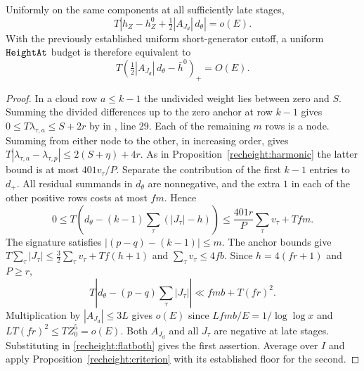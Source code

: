 \begin{corollary}\label{recheight:period-degree}
Uniformly on the same components at all sufficiently late stages,
\[
    T\left|h_Z-h_Z^0+\tfrac12|A_{J_d}|\,d_\theta\right|=o(E).
\]
With the previously established uniform short-generator cutoff, a
uniform \(\texttt{HeightAt}\) budget is therefore equivalent to
\[
       T\left(\tfrac12|A_{J_d}|\,d_\theta-\bar h^0\right)_+=O(E).
\]
\end{corollary}
\begin{proof}
In a cloud row \(a\le k-1\) the undivided weight lies between
zero and \(S\). Summing the divided differences up to the zero
anchor at row \(k-1\) gives \(0\le T\lambda_{\tau,a}\le S+2r\)
by  in ,
line 29. Each of the remaining \(m\) rows is a node. Summing from
either node to the other, in increasing order, gives
\(T|\lambda_{\tau,a}-\lambda_{\tau,p}|\le2(S+\eta)+4r\).
As in Proposition~\ref{recheight:harmonic} the latter bound is
at most \(401v_\tau/P\). Separate the contribution of the first
\(k-1\) entries to \(d_+\). All residual summands in \(d_\theta\)
are nonnegative, and the extra \(1\) in each of the other positive
rows costs at most \(fm\). Hence
\[
 0\le T\left(d_\theta-(k-1)\sum_\tau(|J_\tau|-h)\right)
       \le \frac{401r}{P}\sum_\tau v_\tau+Tfm .
\]
The signature satisfies \(|(p-q)-(k-1)|\le m\). The anchor bounds give
\(T\sum_\tau|J_\tau|\le\tfrac32\sum_\tau v_\tau+Tf(h+1)\) and
\(\sum_\tau v_\tau\le4fb\). Since \(h=4(fr+1)\) and \(P\ge r\),
\[
 T\left|d_\theta-(p-q)\sum_\tau|J_\tau|\right|
         \ll fmb+T(fr)^2 .
\]
Multiplication by \(|A_{J_d}|\le3L\) gives \(o(E)\) since
\(Lfmb/E=1/\log\log x\) and \(LT(fr)^2\le TZ_0^5=o(E)\).
Both \(A_{J_d}\) and all \(J_\tau\) are negative at late stages.
Substituting in \eqref{recheight:flatboth} gives the first assertion.
Average over \(I\) and apply Proposition~\ref{recheight:criterion}
with its established floor for the second.
\end{proof}

